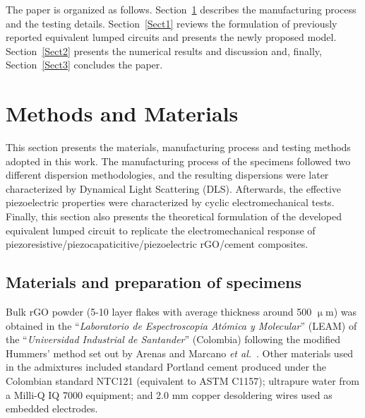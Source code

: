 \documentclass[a4paper,fleqn]{cas-sc}
\begin{document}
The paper is organized as follows. Section~\ref{Sect01} describes the manufacturing process and the testing details. Section~\ref{Sect1} reviews the formulation of previously reported equivalent lumped circuits and presents the newly proposed model. Section~\ref{Sect2} presents the numerical results and discussion and, finally, Section~\ref{Sect3} concludes the paper.



\section{Methods and Materials}\label{Sect01}

This section presents the materials, manufacturing process and testing methods adopted in this work. The manufacturing process of the specimens followed two different dispersion methodologies, and the resulting dispersions were later characterized by Dynamical Light Scattering (DLS). Afterwards, the effective piezoelectric properties were characterized by cyclic electromechanical tests. Finally, this section also presents the theoretical formulation of the developed equivalent lumped circuit to replicate the electromechanical response of piezoresistive/piezocapaticitive/piezoelectric rGO/cement composites.



\subsection{Materials and preparation of specimens}\label{fabrication}

Bulk rGO powder (5-10 layer flakes with average thickness around 500 $\upmu$m) was obtained in the ``\textit{Laboratorio de Espectroscopia Atómica y Molecular}'' (LEAM) of the ``\textit{Universidad Industrial de Santander}'' (Colombia) following the modified Hummers’ method set out by Arenas and Marcano \textit{et al.}~\cite{arenas2019methodology, Marcano2010}. Other materials used in the admixtures included standard Portland cement produced under the Colombian standard NTC121 (equivalent to ASTM C1157); ultrapure water from a Milli-Q IQ 7000 equipment; and 2.0 mm copper desoldering wires used as embedded electrodes. 
\end{document}
